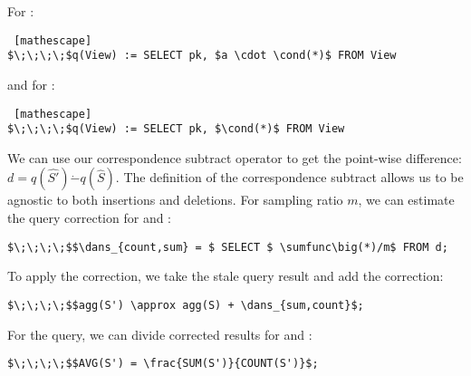 \vspace{.5em}

\noindent For \sumfunc:
\begin{lstlisting} [mathescape]
$\;\;\;\;$q(View) := SELECT pk, $a \cdot \cond(*)$ FROM View
\end{lstlisting}

\noindent and for \countfunc:
\begin{lstlisting} [mathescape]
$\;\;\;\;$q(View) := SELECT pk, $\cond(*)$ FROM View
\end{lstlisting}

We can use our correspondence subtract operator to get the point-wise difference:
$d = q(\hat{S'}) \dot{-} q(\hat{S})$.  
The definition of the correspondence subtract allows us to be agnostic to both insertions and deletions.
For sampling ratio $m$, we can estimate the query correction for \sumfunc and \countfunc:
\begin{lstlisting}[mathescape,basicstyle={\scriptsize}]
$\;\;\;\;$$\dans_{count,sum} = $ SELECT $ \sumfunc\big(*)/m$ FROM d;
\end{lstlisting}
To apply the correction, we take the stale query result and add the correction:
\begin{lstlisting}[mathescape,basicstyle={\scriptsize}]
$\;\;\;\;$$agg(S') \approx agg(S) + \dans_{sum,count}$;
\end{lstlisting}

For the \avgfunc query, we can divide corrected results for \sumfunc and \countfunc:
\begin{lstlisting}[mathescape,basicstyle={\scriptsize}]
$\;\;\;\;$$AVG(S') = \frac{SUM(S')}{COUNT(S')}$;
\end{lstlisting}

\iffalse
\vspace{-1em}
\begin{lstlisting}[mathescape,basicstyle={\scriptsize}]
$\;\;\;\;$$\dans_{count} = $ SELECT $ \sumfunc\big(*)/m$ FROM d;
\end{lstlisting}
\vspace{-1em}

We use the estimated correction to correct the stale query result as follows:
\begin{lstlisting}[mathescape,basicstyle={\scriptsize}]
$\;\;\;\;$$\sumfunc(S') \approx \sumfunc(S) + \dans_{sum}$;
\end{lstlisting}
\vspace{-1em}
\begin{lstlisting}[mathescape,basicstyle={\scriptsize}]
$\;\;\;\;$$\countfunc(S') \approx \countfunc(S) + \dans_{count}$;
\end{lstlisting}
\vspace{-1em}
\fi

